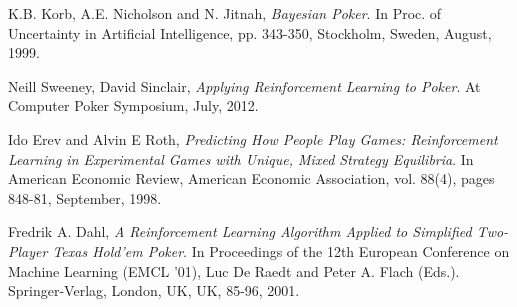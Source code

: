 \documentclass[12pt,pdftex]{article}
\begin{document}


\begin{thebibliography}{9}
K.B. Korb, A.E. Nicholson and N. Jitnah,
 \emph{Bayesian Poker}. 
In Proc. of Uncertainty in Artificial Intelligence, pp. 343-350, 
Stockholm, Sweden, August, 1999.


Neill Sweeney, David Sinclair,
	\emph{Applying Reinforcement Learning to Poker}.
At Computer Poker Symposium, July, 2012.

Ido Erev and  Alvin E Roth, 
\emph{Predicting How People Play Games: Reinforcement Learning in Experimental Games with Unique, Mixed Strategy Equilibria}.
In American Economic Review, American Economic Association, vol. 88(4), pages 848-81, September, 1998.

Fredrik A. Dahl, 
\emph{A Reinforcement Learning Algorithm Applied to Simplified Two-Player Texas Hold'em Poker}. 
In Proceedings of the 12th European Conference on Machine Learning (EMCL '01), Luc De Raedt and Peter A. Flach (Eds.). Springer-Verlag, London, UK, UK, 85-96, 2001.
\end{thebibliography}
\end{document}
